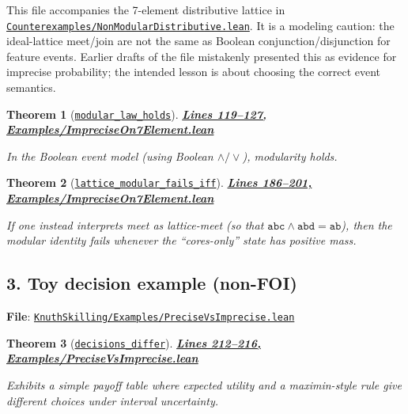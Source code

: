 \documentclass[11pt]{article}
\newtheorem{theorem}{Theorem}[section]
\theoremstyle{definition}
\theoremstyle{remark}
\begin{document}
This file accompanies the 7-element distributive lattice in
\href{https://github.com/zariuq/ks-foundations-of-inference/blob/main/KnuthSkilling/Counterexamples/NonModularDistributive.lean}{\texttt{Counterexamples/NonModularDistributive.lean}}.  It is a modeling caution: the ideal-lattice
meet/join are not the same as Boolean conjunction/disjunction for feature events.  Earlier drafts of
the file mistakenly presented this as evidence for imprecise probability; the intended lesson is
about choosing the correct event semantics.

\begin{theorem}[\href{https://github.com/zariuq/ks-foundations-of-inference/blob/main/KnuthSkilling/Examples/ImpreciseOn7Element.lean\#L124}{\texttt{modular\_law\_holds}}]
\textbf{\href{https://github.com/zariuq/ks-foundations-of-inference/blob/main/KnuthSkilling/Examples/ImpreciseOn7Element.lean\#L119-L127}{Lines 119--127, Examples/ImpreciseOn7Element.lean}}

In the Boolean event model (using Boolean $\wedge/\vee$), modularity holds.
\end{theorem}

\begin{theorem}[\href{https://github.com/zariuq/ks-foundations-of-inference/blob/main/KnuthSkilling/Examples/ImpreciseOn7Element.lean\#L197}{\texttt{lattice\_modular\_fails\_iff}}]
\textbf{\href{https://github.com/zariuq/ks-foundations-of-inference/blob/main/KnuthSkilling/Examples/ImpreciseOn7Element.lean\#L186-L201}{Lines 186--201, Examples/ImpreciseOn7Element.lean}}

If one instead interprets meet as lattice-meet (so that $\texttt{abc} \wedge \texttt{abd} = \texttt{ab}$),
then the modular identity fails whenever the ``cores-only'' state has positive mass.
\end{theorem}

\subsection*{3. Toy decision example (non-FOI)}

\textbf{File}: \href{https://github.com/zariuq/ks-foundations-of-inference/blob/main/KnuthSkilling/Examples/PreciseVsImprecise.lean}{\texttt{KnuthSkilling/Examples/PreciseVsImprecise.lean}}

\begin{theorem}[\href{https://github.com/zariuq/ks-foundations-of-inference/blob/main/KnuthSkilling/Examples/PreciseVsImprecise.lean\#L212}{\texttt{decisions\_differ}}]
\textbf{\href{https://github.com/zariuq/ks-foundations-of-inference/blob/main/KnuthSkilling/Examples/PreciseVsImprecise.lean\#L212-L216}{Lines 212--216, Examples/PreciseVsImprecise.lean}}

Exhibits a simple payoff table where expected utility and a maximin-style rule give different choices
under interval uncertainty.
\end{theorem}
\end{document}
